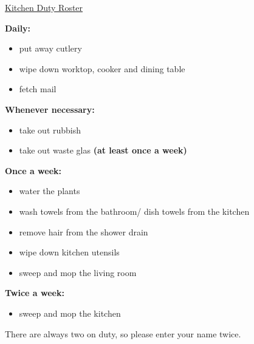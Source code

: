 

	
\pagestyle{empty}
{\Large\underline{Kitchen Duty Roster}}
\newline

\raggedright
\begin{minipage}{8cm}
	\textbf{Daily:}
	\begin{itemize}
		\item put away cutlery
		\item wipe down worktop, cooker and dining table
		\item fetch mail
	\end{itemize}

	\textbf{Whenever necessary:}
	\begin{itemize}
		\item take out rubbish
		\item take out waste glas \textbf{(at least once a week)}
	\end{itemize}
\end{minipage}
\raggedright
\begin{minipage}{8cm}
	\textbf{Once a week:}
	\begin{itemize}
		\item water the plants
		\item wash towels from the bathroom/ dish towels from the kitchen
		\item remove hair from the shower drain
		\item wipe down kitchen utensils
		\item sweep and mop the living room
	\end{itemize}
		\textbf{Twice a week:}
	\begin{itemize}
		\item sweep and mop the kitchen
	\end{itemize}
\end{minipage}
\vspace{2cm}





There are always two on duty, so please enter your name twice.

